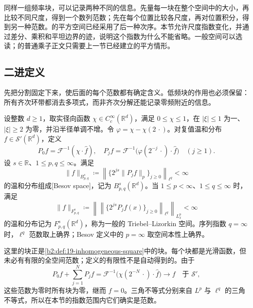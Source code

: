 
同样一组频率块，可以记录两种不同的信息。先量每一块在整个空间中的大小，再比较不同尺度，得到一个数列范数；先在每个位置比较各尺度，再对位置积分，得到另一种范数。的平方空间已经采用了后一种次序。本节允许尺度指数变化，并通过差分、乘积和平坦边界的迹，说明这个指数为什么不能省略。一般空间可以选读；的普通乘子正文只需要上一节已经建立的平方情形。

\subsection{二进定义}
\label{b2:subsec:190501}

先把分割固定下来，使后面的每个范数都有确定含义。低频块的作用也必须保留：所有齐次环带都消去多项式，而非齐次分解还能记录零频附近的信息。

\begin{definition}\label{b2:def:19-besov-triebel-lizorkin}
设整数 \(d\geq1\)，取实径向函数 \(\chi\in C_c^\infty(\mathbb R^d)\)，满足 \(0\leq\chi\leq1\)，在 \(|\xi|\leq1\) 为一、\(|\xi|\geq2\) 为零，并沿半径单调不增。令 \(\varphi=\chi-\chi(2\,\cdot)\)。对复值温和分布 \(f\in\mathcal S'(\mathbb R^d)\)，定义
\[
 P_0f=\mathcal F^{-1}(\chi\cdot\widehat f),
 \quad P_jf=\mathcal F^{-1}\bigl(\varphi(2^{-j}\,\cdot)\cdot\widehat f\bigr)
 \quad(j\geq1).
\]
设 \(s\in\mathbb R\)、\(1\leq p,q\leq\infty\)。满足
\[
 \|f\|_{B^s_{p,q}}
 \coloneqq\left\|\bigl\{2^{js}\|P_jf\|_p\bigr\}_{j\geq0}\right\|_{\ell^q}<\infty
\]
的温和分布组成[Besov space]，记为 \(B^s_{p,q}(\mathbb R^d)\)。当 \(1\leq p<\infty\)、\(1\leq q\leq\infty\) 时，满足
\[
 \|f\|_{F^s_{p,q}}
 \coloneqq\left\|\left\|\bigl\{2^{js}P_jf(x)\bigr\}_{j\geq0}\right\|_{\ell^q}\right\|_{L^p_x}<\infty
\]
的温和分布记为 \(F^s_{p,q}(\mathbb R^d)\)，称为一般的 Triebel--Lizorkin 空间。序列指数 \(q=\infty\) 时，\(\ell^q\) 范数取上确界；Besov 定义中的 \(p=\infty\) 取空间本性上确界。
\end{definition}
这里的块正是\cref{b2:def:19-inhomogeneous-square}中的块。每个块都是光滑函数，但未必有有限的全空间范数；定义的有限性不是自动得到的。由于
\[
 P_0f+\sum_{j=1}^NP_jf
 =\mathcal F^{-1}\bigl(\chi(2^{-N}\,\cdot)\cdot\widehat f\bigr)
 \longrightarrow f\quad\text{于 }\mathcal S',
\]
这些范数为零时所有块为零，继而 \(f=0\)。三角不等式分别来自 \(L^p\) 与 \(\ell^q\) 的三角不等式，所以在本节的指数范围内它们确实是范数。

